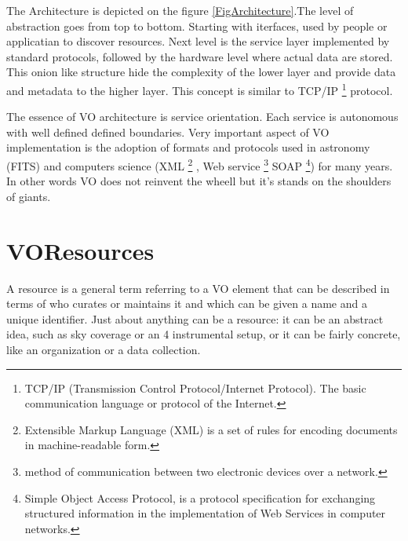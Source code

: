 \clearpage

The Architecture is depicted on the figure \ref{FigArchitecture}.The
level of abstraction goes from top to bottom. Starting with iterfaces,
used by people or applicatian to discover resources.  Next level is
the service layer implemented by standard protocols, followed by the
hardware level where actual data are stored. This onion like structure
hide the complexity of the lower layer and provide data and metadata
to the higher layer. This concept is similar to TCP/IP
\footnote{TCP/IP (Transmission Control Protocol/Internet Protocol).
  The basic communication language or protocol of the Internet.}
protocol.


The essence of VO architecture is service orientation. Each service is
autonomous with well defined defined boundaries. Very important aspect
of VO implementation is the adoption of formats and protocols used in
astronomy (FITS) and computers science (XML \footnote{Extensible
  Markup Language (XML) is a set of rules for encoding documents in
  machine-readable form.} , Web service \footnote{method of
  communication between two electronic devices over a network.} SOAP
\footnote{Simple Object Access Protocol, is a protocol specification
  for exchanging structured information in the implementation of Web
  Services in computer networks.}) for many years. In other words VO
does not reinvent the wheell but it's stands on the shoulders of
giants.


\section{VOResources}

A resource is a general term referring to a VO element that can be
described in terms of who curates or maintains it and which can be
given a name and a unique identifier. Just about anything can be a
resource: it can be an abstract idea, such as sky coverage or an
                                                                   4
instrumental setup, or it can be fairly concrete, like an organization
or a data collection. \cite{bensonivoa}




